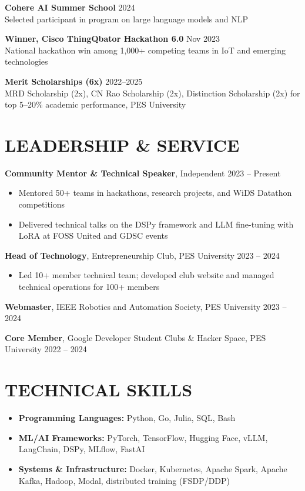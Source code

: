 \documentclass[a4paper,9pt]{extarticle}
\begin{document}
\medskip
\noindent
\textbf{Cohere AI Summer School} \hfill 2024\\
Selected participant in program on large language models and NLP

\medskip
\noindent
\textbf{Winner, Cisco ThingQbator Hackathon 6.0} \hfill Nov 2023\\
National hackathon win among 1,000+ competing teams in IoT and emerging technologies

\medskip
\noindent
\textbf{Merit Scholarships (6x)} \hfill 2022--2025\\
MRD Scholarship (2x), CN Rao Scholarship (2x), Distinction Scholarship (2x) for top 5--20\% academic performance, PES University

\section*{LEADERSHIP \& SERVICE}
\noindent
\textbf{Community Mentor \& Technical Speaker}, Independent \hfill 2023 -- Present
\begin{itemize}
    \item Mentored 50+ teams in hackathons, research projects, and WiDS Datathon competitions
    \item Delivered technical talks on the DSPy framework and LLM fine-tuning with LoRA at FOSS United and GDSC events
\end{itemize}

\noindent
\textbf{Head of Technology}, Entrepreneurship Club, PES University \hfill 2023 -- 2024
\begin{itemize}
    \item Led 10+ member technical team; developed club website and managed technical operations for 100+ members
\end{itemize}

\noindent
\textbf{Webmaster}, IEEE Robotics and Automation Society, PES University \hfill 2023 -- 2024

\noindent
\textbf{Core Member}, Google Developer Student Clubs \& Hacker Space, PES University \hfill 2022 -- 2024

\section*{TECHNICAL SKILLS}
\begin{itemize}
    \item \textbf{Programming Languages:} Python, Go, Julia, SQL, Bash
    \item \textbf{ML/AI Frameworks:} PyTorch, TensorFlow, Hugging Face, vLLM, LangChain, DSPy, MLflow, FastAI
    \item \textbf{Systems \& Infrastructure:} Docker, Kubernetes, Apache Spark, Apache Kafka, Hadoop, Modal, distributed training (FSDP/DDP)
\end{itemize}
\end{document}
